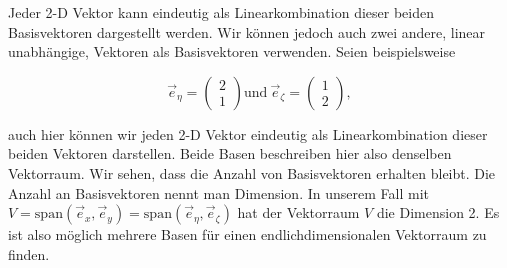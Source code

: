 Jeder 2-D Vektor kann eindeutig als Linearkombination dieser beiden Basisvektoren dargestellt werden. Wir können jedoch auch zwei andere, linear unabhängige, Vektoren als Basisvektoren verwenden. Seien beispielsweise

\begin{equation*}
    \vec{e}_\eta = \begin{pmatrix} 2 \\ 1 \end{pmatrix} \text{und} \ \vec{e}_\zeta = \begin{pmatrix} 1 \\ 2 \end{pmatrix},
\end{equation*}

auch hier können wir jeden 2-D Vektor eindeutig als Linearkombination dieser beiden Vektoren darstellen. Beide Basen beschreiben hier also denselben Vektorraum. Wir sehen, dass die Anzahl von Basisvektoren erhalten bleibt. Die Anzahl an Basisvektoren nennt man Dimension. In unserem Fall mit \( V = \text{span}(\vec{e}_x, \vec{e}_y) = \text{span}(\vec{e}_\eta, \vec{e}_\zeta) \) hat der Vektorraum \( V \) die Dimension 2. Es ist also möglich mehrere Basen für einen endlichdimensionalen Vektorraum zu finden.

